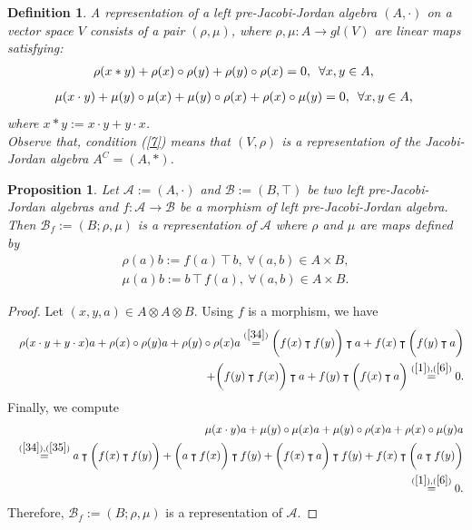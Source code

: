 \documentclass[12pt]{amsart}
\newtheorem{definition}[Theorem]{Definition}
\newtheorem{proposition}[Theorem]{Proposition}
\begin{document}
	\begin{definition}\label{D7}
		A representation of a left pre-Jacobi-Jordan algebra $ (A,\cdot) $ on a vector space $ V $
		consists of a pair $ (\rho,\mu) $, where $ \rho,\mu : A\to gl(V) $ are linear maps satisfying:	
		\begin{eqnarray}
			\label{7}
			\rho(x\ast y)+\rho(x)\circ \rho(y)+\rho(y)\circ \rho(x)=0, \mbox{\,\ $\forall x,y\in A $, }
		\end{eqnarray}
		\begin{eqnarray}
			\label{8}
			\mu(x\cdot y)+\mu(y)\circ \mu(x)+\mu(y)\circ\rho(x)+\rho(x)\circ\mu(y)=0, \mbox{\,\ $\forall x,y\in A $, }
		\end{eqnarray}
		where $ x\ast y:=x\cdot y+y\cdot x $.\\
		Observe that, condition (\ref{7}) means that $ (V,\rho) $ is a representation of the  Jacobi-Jordan algebra $A^C=(A,\ast) $.	
	\end{definition}
\begin{proposition}\label{Pro67}
	Let $ \mathcal{A}:=(A,\cdot)$ and $ \mathcal{B}:=(B,\intercal)$ be two left pre-Jacobi-Jordan algebras and $ f : \mathcal{A} \to \mathcal{B}$ be a morphism of left pre-Jacobi-Jordan algebra. Then $ \mathcal{B}_{f}:=(B;\rho,\mu)$ is a representation of $\mathcal{A}$ where $ \rho $ and $ \mu $ are maps defined by 
	\begin{eqnarray}
		\label{34}
		\rho(a)b:=f(a)\intercal b,\ \forall (a,b)\in A\times B, \\
		\label{35}
		\mu(a)b:=b\intercal f(a),\  \forall (a,b)\in A\times B.
	\end{eqnarray}
\end{proposition}
\begin{proof}
	Let $ (x,y,a)\in A\otimes A\otimes B $. Using $f$ is a morphism, we have 	
	\begin{eqnarray}
		&& \rho(x\cdot y+y\cdot x)a+\rho(x)\circ \rho(y)a+\rho(y)\circ \rho(x)a\overset{(\ref{34})}{=}\bigg(f(x)\intercal f(y)\bigg)\intercal a+f(x)\intercal\bigg( f(y)\intercal a\bigg)\nonumber\\
		&&
		+\bigg (f(y)\intercal f(x)\bigg)\intercal a+ f(y)\intercal \bigg( f(x)\intercal a\bigg)\overset{(\ref{1}),(\ref{6})}{=}0.\nonumber
	\end{eqnarray}
	Finally, we compute
	\begin{eqnarray}
		&&\mu(x\cdot y)a+\mu(y)\circ\mu(x)a+\mu(y)\circ\rho(x)a+\rho(x)\circ\mu(y)a\nonumber\\
		&&\overset{(\ref{34}),
			(\ref{35})}{=}a\intercal\bigg(f(x)\intercal f(y)\bigg)
		+\bigg(a\intercal f(x)\bigg)\intercal f(y)+\bigg(f(x)\intercal a\bigg)\intercal f(y)+f(x)\intercal\bigg(a\intercal f(y)\bigg)\nonumber\\
		&&\overset{(\ref{1}),(\ref{6})}{=}0.\nonumber
	\end{eqnarray}
	Therefore, $ \mathcal{B}_{f}:=(B;\rho,\mu)$ is a representation of $\mathcal{A}$. 	
\end{proof}
\end{document}
